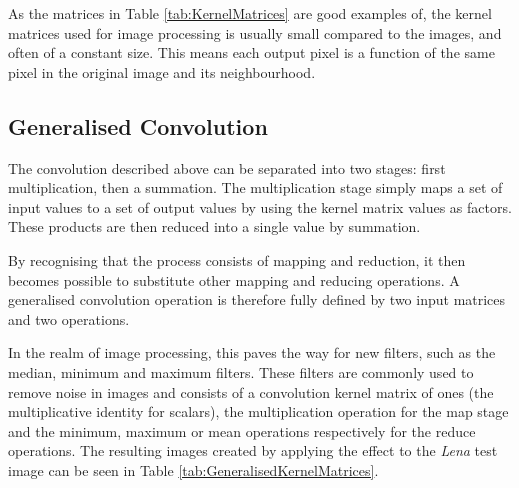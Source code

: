 As the matrices in Table \ref{tab:KernelMatrices} are good examples of, the kernel matrices used for image processing is usually small compared to the images, and often of a constant size.
This means each output pixel is a function of the same pixel in the original image and its neighbourhood.

\subsection{Generalised Convolution}
The convolution described above can be separated into two stages: first multiplication, then a summation.
The multiplication stage simply maps a set of input values to a set of output values by using the kernel matrix values as factors.
These products are then reduced into a single value by summation.

By recognising that the process consists of mapping and reduction,
it then becomes possible to substitute other mapping and reducing operations.
A generalised convolution operation is therefore fully defined by two input matrices and two operations.

In the realm of image processing, this paves the way for new filters, such as the median, minimum and maximum filters.
These filters are commonly used to remove noise in images and consists of a convolution kernel matrix of ones (the multiplicative identity for scalars),
the multiplication operation for the map stage and the minimum, maximum or mean operations respectively for the reduce operations.
The resulting images created by applying the effect to the \textit{Lena} test image can be seen in Table \ref{tab:GeneralisedKernelMatrices}.

